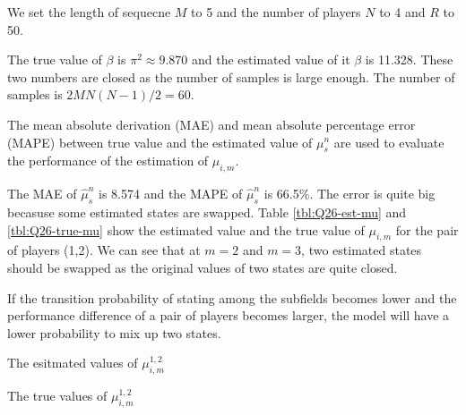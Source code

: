 \documentclass[12pt]{article}
\newenvironment{problem}[2][Problem]{\begin{trivlist}
\item[\hskip \labelsep {\bfseries #1}\hskip \labelsep {\bfseries #2.}]}{\end{trivlist}}
\begin{document}
\begin{problem}{2.6.20}
We set the length of sequecne $M$ to 5 and the number of players $N$ to 4 and $R$
to 50.

The true value of $\beta$ is $\pi^2 \approx 9.870$ and the estimated value of it
$\beta$ is 11.328. These two numbers are closed as the number of samples is 
large enough. The number of samples is $2MN(N-1)/2 = 60$.

The mean absolute derivation (MAE) and mean absolute percentage error (MAPE) 
between true value and the estimated value of $\mu^{n}_{s}$ are used to evaluate
the performance of the estimation of $\mu_{i,m}$.

The MAE of $\hat{\mu}^{n}_{s}$ is 8.574 and the MAPE of $\hat{\mu}^{n}_{s}$ is 
66.5\%. The error is quite big becasuse some estimated states are swapped. Table
\ref{tbl:Q26-est-mu} and \ref{tbl:Q26-true-mu} show the estimated value and 
the true value of $\mu_{i,m}$ for the pair of players (1,2). We can see that 
at $m = 2$ and $m = 3$, two estimated states should be swapped as the original values
of two states are quite closed.

If the transition probability of stating among the subfields becomes lower and 
the performance difference of a pair of players becomes larger, the model will 
have a lower probability to mix up two states.

\begin{table}
    \centering
    \caption{The esitmated values of $\mu^{1,2}_{i,m}$}\label{tbl:Q26-est-mu}
\end{table}

\begin{table}
    \centering
    \caption{The true values of $\mu^{1,2}_{i,m}$}\label{tbl:Q26-true-mu}
\end{table}  

\end{problem}
\pagebreak
\end{document}
